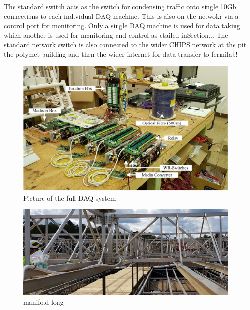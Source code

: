 The standard switch acts as the switch for condensing traffic onto single 10Gb connections to each
individual DAQ machine. This is also on the netwokr via a control port for monitoring. Only a
single DAQ machine is used for data taking which another is used for monitoring and control as
etailed inSection... The standard network switch is also connected to the wider CHIPS network at
the pit the polymet building and then the wider internet for data transfer to fermilab!

\begin{figure} %
    \includegraphics[width=\textwidth]{diagrams/5-daq/full_setup.pdf}
    \caption[full set up short]
    {Picture of the full \chipsfive DAQ system}
    \label{fig:full_setup}
\end{figure}

\begin{figure} %
    \includegraphics[width=\textwidth]{diagrams/5-daq/manifold.jpg}
    \caption[manifold short]
    {manifold long}
    \label{fig:manifold}
\end{figure}

